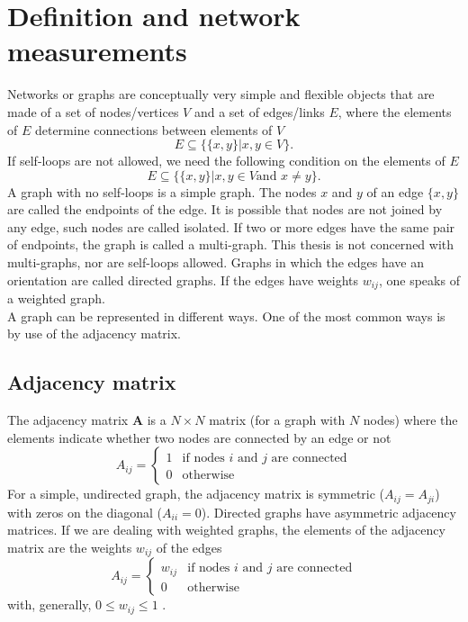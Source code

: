 \documentclass[11 pt , letterpaper , twoside , openright]{book}
\begin{document}


\section{Definition and network measurements}
\label{netDef}

Networks or graphs are conceptually very simple and flexible objects that are made of a set of nodes/vertices $V$ and a set of edges/links $E$, where the elements of $E$ determine connections between elements of $V$ \cite{Costa2018}
\begin{equation}
	E \subseteq \{\{x, y\}| x, y \in V \}.
\end{equation}
If self-loops are not allowed, we need the following condition on the elements of $E$
\begin{equation}
	E \subseteq \{\{x, y\}| x, y \in V \text{and\ } x \neq y \}.
\end{equation}
A graph with no self-loops is a simple graph. The nodes $x$ and $y$ of an edge $\{x, y\}$ are called the endpoints of the edge. It is possible that nodes are not joined by any edge, such nodes are called isolated. If two or more edges have the same pair of endpoints, the graph is called a multi-graph. This thesis is not concerned with multi-graphs, nor are self-loops allowed. Graphs in which the edges have an orientation are called directed graphs. If the edges have weights $w_{ij}$, one speaks of a weighted graph.\\
A graph can be represented in different ways. One of the most common ways is by use of the adjacency matrix.\\

\subsection{Adjacency matrix}

The adjacency matrix \textbf{A} is a $N \times N$ matrix (for a graph with $N$ nodes) where the elements indicate whether two nodes are connected by an edge or not \cite{Mata2020}
\begin{equation}
	A_{ij} = 
	\begin{cases}
		1 & \text{if nodes $i$ and $j$ are connected}\\
		0 & \text{otherwise}
	\end{cases}
\end{equation}
For a simple, undirected graph, the adjacency matrix is symmetric ($A_{ij} = A_{ji}$) with zeros on the diagonal ($A_{ii} = 0$). Directed graphs have asymmetric adjacency matrices. If we are dealing with weighted graphs, the elements of the adjacency matrix are the weights $w_{ij}$ of the edges
\begin{equation}
	A_{ij} = 
	\begin{cases}
		w_{ij} & \text{if nodes $i$ and $j$ are connected}\\
		0 & \text{otherwise}
	\end{cases}
\end{equation}
with, generally, $0 \leqslant w_{ij} \leqslant 1$ \cite{Mata2020}. \\
\end{document}
